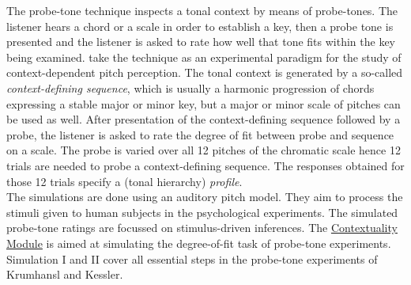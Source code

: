 The probe-tone technique inspects a tonal context by means of
probe-tones. The listener hears a chord or a scale in order to
establish a key, then a probe tone is presented and the listener
is asked to rate how well that tone fits within the key being
examined.  take the technique as an
experimental paradigm for the study of context-dependent pitch
perception. The tonal context is generated by a so-called {\sl
context-defining sequence}, which is usually a harmonic
progression of chords expressing a stable major or minor key, but
a major or minor scale of pitches can be used as well. After
presentation of the context-defining sequence followed by a probe,
the listener is asked to rate the degree of fit between probe and
sequence on a scale. The probe is varied over all 12 pitches of
the chromatic scale hence 12 trials are needed to probe a
context-defining sequence. The responses obtained for those 12
trials specify a (tonal hierarchy) {\sl profile}.\\ The
simulations are done using an auditory pitch model. They aim to
process the stimuli given to human subjects in the psychological
experiments. The simulated probe-tone ratings are focussed on
stimulus-driven inferences. The
\hyperlink{Concepts:ContextualityModule}{Contextuality Module} is
aimed at simulating the degree-of-fit task of probe-tone
experiments. Simulation I and II cover all essential steps in the
probe-tone experiments of Krumhansl and Kessler.

